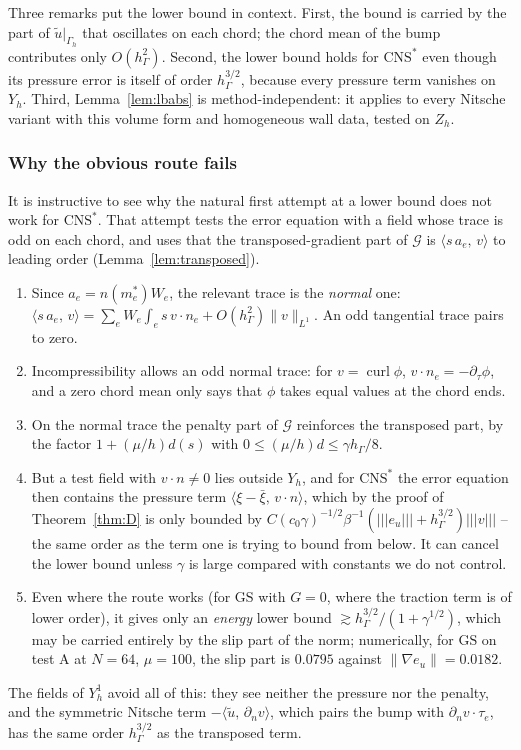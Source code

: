 \documentclass[pdflatex,sn-mathphys-num]{sn-jnl}
\theoremstyle{thmstyleone}
\theoremstyle{thmstylethree}
\newcommand{\hG}{h_\Gamma}
\newcommand{\Gh}{\Gamma_h}
\newcommand{\Zh}{Z_h}
\newcommand{\Yh}{Y_h}
\newcommand{\dn}{\partial_n}
\newcommand{\dt}{\partial_\tau}
\newcommand{\ut}{\tilde u}
\newcommand{\ip}[2]{\langle #1,\, #2\rangle}
\newcommand{\tnorm}[1]{|\!|\!|#1|\!|\!|}
\newcommand{\norm}[1]{\lVert #1\rVert}
\newcommand{\GS}{\mathrm{GS}}
\newcommand{\CNS}{\mathrm{CNS}^\ast}
\newcommand{\curl}{\operatorname{curl}}
\newcommand{\Gc}{\mathcal G}
\begin{document}
Three remarks put the lower bound in context. First, the bound is carried by the part of $\ut|_{\Gh}$ that oscillates on each chord; the chord mean of the bump contributes only $O(\hG^2)$. Second, the lower bound holds for $\CNS$ even though its pressure error is itself of order $\hG^{3/2}$, because every pressure term vanishes on $\Yh$. Third, Lemma~\ref{lem:lbabs} is method-independent: it applies to every Nitsche variant with this volume form and homogeneous wall data, tested on $\Zh$.

\subsubsection*{Why the obvious route fails}
It is instructive to see why the natural first attempt at a lower bound does not work for $\CNS$. That attempt tests the error equation with a field whose trace is odd on each chord, and uses that the transposed-gradient part of $\Gc$ is $\ip{s\,a_e}{v}$ to leading order (Lemma~\ref{lem:transposed}).
\begin{enumerate}
\item Since $a_e=n(m_e^\ast)W_e$, the relevant trace is the \emph{normal} one: $\ip{s\,a_e}{v}=\sum_eW_e\int_es\,v\cdot n_e+O(\hG^2)\norm{v}_{L^1}$. An odd tangential trace pairs to zero.
\item Incompressibility allows an odd normal trace: for $v=\curl\phi$, $v\cdot n_e=-\dt\phi$, and a zero chord mean only says that $\phi$ takes equal values at the chord ends.
\item On the normal trace the penalty part of $\Gc$ reinforces the transposed part, by the factor $1+(\mu/h)d(s)$ with $0\le(\mu/h)d\le\gamma\hG/8$.
\item But a test field with $v\cdot n\ne0$ lies outside $\Yh$, and for $\CNS$ the error equation then contains the pressure term $\ip{\xi-\bar\xi}{v\cdot n}$, which by the proof of Theorem~\ref{thm:D} is only bounded by $C(c_0\gamma)^{-1/2}\beta^{-1}(\tnorm{e_u}+\hG^{3/2})\tnorm v$ -- the same order as the term one is trying to bound from below. It can cancel the lower bound unless $\gamma$ is large compared with constants we do not control.
\item Even where the route works (for $\GS$ with $G=0$, where the traction term is of lower order), it gives only an \emph{energy} lower bound $\gtrsim\hG^{3/2}/(1+\gamma^{1/2})$, which may be carried entirely by the slip part of the norm; numerically, for $\GS$ on test A at $N=64$, $\mu=100$, the slip part is $0.0795$ against $\norm{\nabla e_u}=0.0182$.
\end{enumerate}
The fields of $\Yh^1$ avoid all of this: they see neither the pressure nor the penalty, and the symmetric Nitsche term $-\ip{\ut}{\dn v}$, which pairs the bump with $\dn v\cdot\tau_e$, has the same order $\hG^{3/2}$ as the transposed term.
\end{document}
